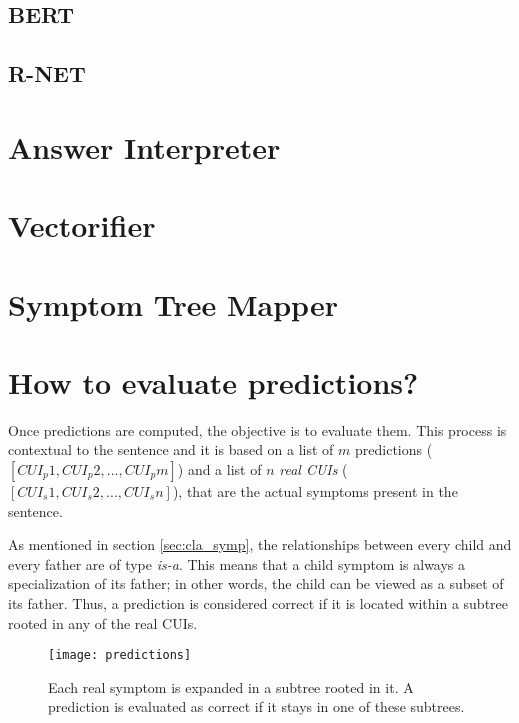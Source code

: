 \subsection{BERT}


\subsection{R-NET}



\section{Answer Interpreter}
\label{sec:answer_interpreter}



\section{Vectorifier}
\label{sec:vectorifier}



\section{Symptom Tree Mapper}
\label{sec:symptom_tree_mapper}



\section{How to evaluate predictions?}
\label{sec:eval_results}
Once predictions are computed, the objective is to evaluate them. This process is contextual to the sentence and it is based on a list of $m$ predictions ($[CUI_{p}1, CUI_{p}2, ..., CUI_{p}m]$) and a list of $n$ \emph{real CUIs} ($[CUI_{s}1, CUI_{s}2, ..., CUI_{s}n]$), that are the actual symptoms present in the sentence.

As mentioned in section \ref{sec:cla_symp}, the relationships between every child and every father are of type \textit{is-a}. This means that a child symptom is always a specialization of its father; in other words, the child can be viewed as a subset of its father. Thus, a prediction is considered correct if it is located within a subtree rooted in any of the real CUIs.

\begin{figure}[h]
\centering
\texttt{[image: predictions]}
\caption{Each real symptom is expanded in a subtree rooted in it. A prediction is evaluated as correct if it stays in one of these subtrees.}
\medskip
\end{figure}

